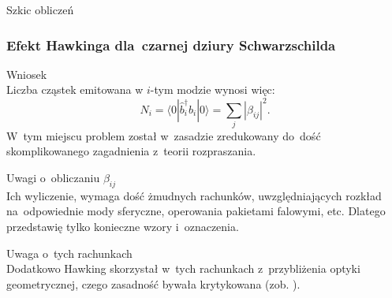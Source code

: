 \documentclass[10pt,t]{beamer}
\begin{document}
\begin{frame}{Szkic obliczeń}
  \frametitle{Efekt Hawkinga dla~czarnej dziury Schwarzschilda}


  Wniosek \\
  Liczba cząstek emitowana w $i$-tym modzie wynosi więc:
  \begin{equation}
    \label{eq:Promieniowanie-Hawkinga-23}
    N_{ i } =
    \langle 0 | \widehat{ b }^{ \dagger }_{ i } \widehat{ b }_{ i } | 0 \rangle
    = \sum_{ j } | \beta_{ i j } |^{ 2 }.
  \end{equation}
  W~tym miejscu problem został w~zasadzie zredukowany do~dość
  skomplikowanego zagadnienia z~teorii rozpraszania.

  Uwagi o~obliczaniu $\beta_{ i j }$ \\
  Ich wyliczenie, wymaga dość żmudnych rachunków, uwzględniających
  rozkład na~odpowiednie mody sferyczne, operowania pakietami
  falowymi, etc. Dlatego przedstawię tylko konieczne wzory
  i~oznaczenia.

  Uwaga o~tych rachunkach \\
  Dodatkowo Hawking skorzystał w~tych rachunkach z~przybliżenia
  optyki geometrycznej, czego zasadność bywała krytykowana (zob.
  \cite{FredenhagenHaagDerivationOfHawkingRadiation1990}).

\end{frame}
\end{document}
